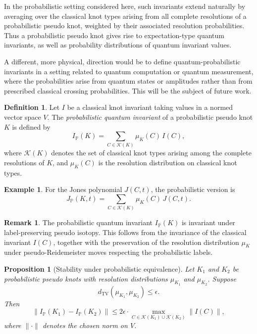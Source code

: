 \documentclass[a4paper, reqno, 12pt]{amsart}
\theoremstyle{plain}
\newtheorem{proposition}[theorem]{Proposition}
\theoremstyle{definition}
\newtheorem{definition}[theorem]{Definition}
\newtheorem{example}[theorem]{Example}
\newtheorem{remark}[theorem]{Remark}
\begin{document}
In the probabilistic setting considered here, such invariants extend naturally by averaging over the classical knot types arising from all complete resolutions of a probabilistic pseudo knot, weighted by their associated resolution probabilities. Thus a probabilistic pseudo knot gives rise to expectation-type quantum invariants, as well as probability distributions of quantum invariant values.

A different, more physical, direction would be to define quantum-probabilistic invariants in a setting related to quantum computation or quantum measurement, where the probabilities arise from quantum states or amplitudes rather than from prescribed classical crossing probabilities. 
This will be the subject of future work.





\begin{definition}\rm
Let \(I\) be a classical knot invariant taking values in a normed vector space \(V\). The \emph{probabilistic quantum invariant} of a probabilistic pseudo knot \(K\) is defined by
\[
I_{\mathbb P}(K)
=
\sum_{C\in\mathcal K(K)}
\mu_K(C)\,I(C),
\]
where \(\mathcal K(K)\) denotes the set of classical knot types arising among the complete resolutions of \(K\), and \(\mu_K(C)\) is the resolution distribution on classical knot types.
\end{definition}

\begin{example}\rm
For the Jones polynomial \(J(C,t)\), the probabilistic version is
\[
J_{\mathbb P}(K,t)
=
\sum_{C\in\mathcal K(K)}
\mu_K(C)\,J(C,t).
\]
\end{example}

\begin{remark}\rm
The probabilistic quantum invariant \(I_{\mathbb P}(K)\) is invariant under label-preserving pseudo isotopy. This follows from the invariance of the classical invariant \(I(C)\), together with the preservation of the resolution distribution \(\mu_K\) under pseudo-Reidemeister moves respecting the probabilistic labels.
\end{remark}

\begin{proposition}[Stability under probabilistic equivalence]
Let \(K_1\) and \(K_2\) be probabilistic pseudo knots with resolution distributions \(\mu_{K_1}\) and \(\mu_{K_2}\). Suppose
\[
d_{\mathrm{TV}}(\mu_{K_1},\mu_{K_2})\le \epsilon.
\]
Then
\[
\|I_{\mathbb P}(K_1)-I_{\mathbb P}(K_2)\|
\le
2\epsilon
\cdot
\max_{C\in\mathcal K(K_1)\cup\mathcal K(K_2)}
\|I(C)\|,
\]
where \(\|\cdot\|\) denotes the chosen norm on \(V\).
\end{proposition}
\end{document}
